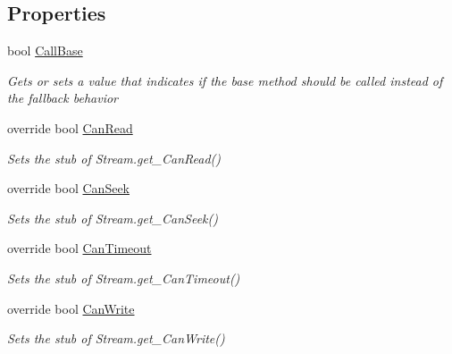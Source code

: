 \subsection*{Properties}
\begin{DoxyCompactItemize}
\item 
bool \hyperlink{class_system_1_1_i_o_1_1_fakes_1_1_stub_stream_a152e1c23641dd93b89bd96bbb0d3618c}{Call\-Base}
\begin{DoxyCompactList}\small\item\em Gets or sets a value that indicates if the base method should be called instead of the fallback behavior\end{DoxyCompactList}\item 
override bool \hyperlink{class_system_1_1_i_o_1_1_fakes_1_1_stub_stream_a8bf198380caa86ecb871194bd0889de9}{Can\-Read}
\begin{DoxyCompactList}\small\item\em Sets the stub of Stream.\-get\-\_\-\-Can\-Read()\end{DoxyCompactList}\item 
override bool \hyperlink{class_system_1_1_i_o_1_1_fakes_1_1_stub_stream_a965ed34f7acf89694db1cda04de54154}{Can\-Seek}
\begin{DoxyCompactList}\small\item\em Sets the stub of Stream.\-get\-\_\-\-Can\-Seek()\end{DoxyCompactList}\item 
override bool \hyperlink{class_system_1_1_i_o_1_1_fakes_1_1_stub_stream_a9904a38fb4a80f5c9716b044ba3a6ec1}{Can\-Timeout}
\begin{DoxyCompactList}\small\item\em Sets the stub of Stream.\-get\-\_\-\-Can\-Timeout()\end{DoxyCompactList}\item 
override bool \hyperlink{class_system_1_1_i_o_1_1_fakes_1_1_stub_stream_ad0f2985991a3229063b5ba1accd3eb16}{Can\-Write}
\begin{DoxyCompactList}\small\item\em Sets the stub of Stream.\-get\-\_\-\-Can\-Write()\end{DoxyCompactList}\item 

\end{DoxyCompactItemize}
